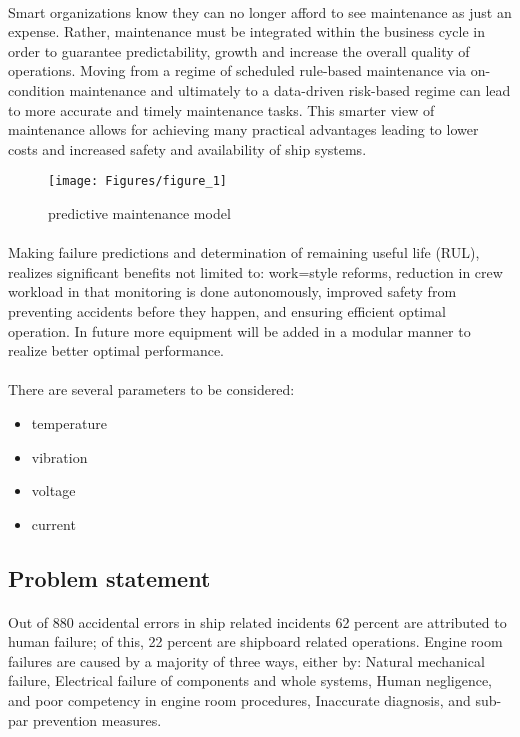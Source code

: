 \paragraph{}Smart organizations know they can no longer afford to see maintenance as just an expense. Rather, maintenance must be integrated within the business cycle in order to guarantee predictability, growth and increase the overall quality of operations. Moving from a regime of scheduled rule-based maintenance via on-condition maintenance and ultimately to a data-driven risk-based regime can lead to more accurate and timely maintenance tasks. This smarter view of maintenance allows for achieving many practical advantages leading to lower costs and increased safety and availability of ship
systems.\cite{knutsen_beyond_2014}
\begin{figure}
\texttt{[image: Figures/figure\_1]}
\caption{predictive maintenance model
\cite{pukrushpan_modeling_2003}}
\end{figure}

\paragraph{}Making  failure predictions and determination of remaining useful life (RUL), realizes significant benefits not limited to: work=style reforms, reduction in crew workload in that monitoring is done autonomously, improved safety from preventing accidents before they happen, and ensuring efficient optimal operation.
\cite{gaeid_diagnosis_2010}
In future more equipment will be added in a modular manner to realize better optimal performance.

\paragraph{}There are several parameters to be considered:
\begin{itemize}
\item temperature
\item vibration 
\item voltage 
\item current

\end{itemize}


%

\subsection{Problem statement}
\paragraph{} Out of 880 accidental errors in ship related incidents 62 percent are attributed to human failure; of this, 22 percent are shipboard related operations. 
Engine room failures are caused by a majority of three ways, either by:  Natural mechanical failure, Electrical failure of components and whole systems, Human negligence, and poor competency in engine room procedures, Inaccurate diagnosis, and sub-par prevention measures.
